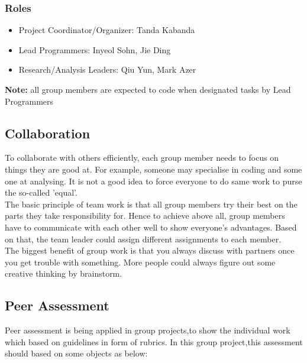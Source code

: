 \documentclass[a4paper,11pt]{article}
\begin{document}
\subsubsection[short]{Roles}

\begin{itemize}%
	\item Project Coordinator/Organizer: Tanda Kabanda
	\item Lead Programmers: Inyeol Sohn, Jie Ding
	\item Research/Analysis Leaders: Qiu Yun, Mark Azer
\end{itemize}

\textbf{Note:} all group members are expected to code when designated tasks by Lead Programmers

\subsection{Collaboration}%
To collaborate with others efficiently, each group member needs to focus on things they are good at. For example, someone may specialise in coding and some one at analysing. It is not a good idea to force everyone to do same work to purse the so-called 'equal'.\\The basic principle of team work is that all group members try their best on the parts they take responsibility for. Hence to achieve above all, group members have to communicate with each other well to show everyone's advantages. Based on that, the team leader could assign different assignments to each member. \\The biggest benefit of group work is that you always discuss with partners once you get trouble with something. More people could always figure out some creative thinking by brainstorm.

\subsection{Peer Assessment}%
Peer assessment is being applied in group projects,to show the individual work which based on guidelines in form of rubrics. In this group project,this assessment should based on some objects as below:
\end{document}
